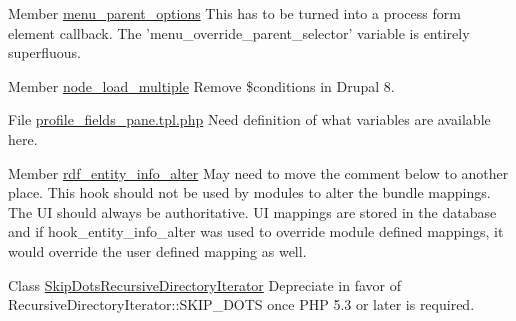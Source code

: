 \label{todo__todo000017}
\hypertarget{todo__todo000017}{}
 
\begin{DoxyDescription}
\item[Member \hyperlink{menu_8module_aa1901dfb8654ccbacd62480ccb8c8f9e}{menu\_\-parent\_\-options} ]This has to be turned into a process form element callback. The 'menu\_\-override\_\-parent\_\-selector' variable is entirely superfluous. 
\end{DoxyDescription}

\label{todo__todo000018}
\hypertarget{todo__todo000018}{}
 
\begin{DoxyDescription}
\item[Member \hyperlink{node_8module_a12f29f65250380f9e592d8d5497313e3}{node\_\-load\_\-multiple} ]Remove \$conditions in Drupal 8. 
\end{DoxyDescription}

\label{todo__todo000044}
\hypertarget{todo__todo000044}{}
 
\begin{DoxyDescription}
\item[File \hyperlink{profile__fields__pane_8tpl_8php}{profile\_\-fields\_\-pane.tpl.php} ]Need definition of what variables are available here. 
\end{DoxyDescription}

\label{todo__todo000019}
\hypertarget{todo__todo000019}{}
 
\begin{DoxyDescription}
\item[Member \hyperlink{rdf_8module_aba691a244451c05199bf3aec8736fefe}{rdf\_\-entity\_\-info\_\-alter} ]May need to move the comment below to another place. This hook should not be used by modules to alter the bundle mappings. The UI should always be authoritative. UI mappings are stored in the database and if hook\_\-entity\_\-info\_\-alter was used to override module defined mappings, it would override the user defined mapping as well. 
\end{DoxyDescription}

\label{todo__todo000005}
\hypertarget{todo__todo000005}{}
 
\begin{DoxyDescription}
\item[Class \hyperlink{classSkipDotsRecursiveDirectoryIterator}{SkipDotsRecursiveDirectoryIterator} ]Depreciate in favor of RecursiveDirectoryIterator::SKIP\_\-DOTS once PHP 5.3 or later is required. 
\end{DoxyDescription}

